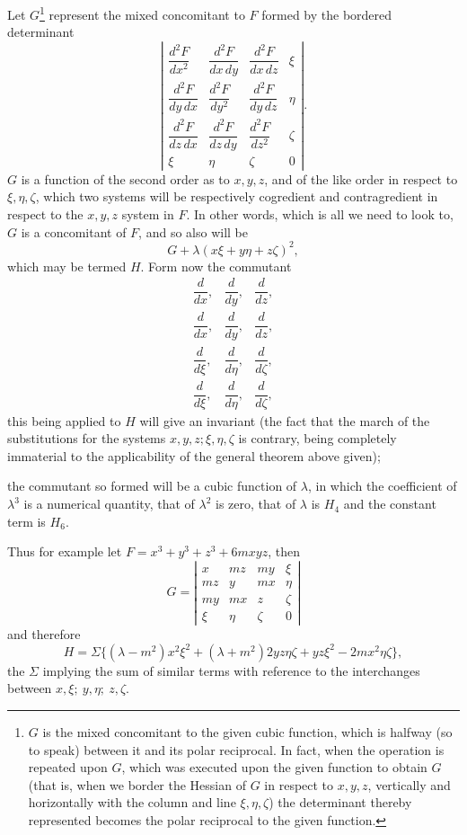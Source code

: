 \documentclass[11pt]{article}
\newcommand{\sourcepage}[1]{\marginpar{\scriptsize p.~#1}}
\begin{document}
Let $G$\footnote{$G$ is the mixed concomitant to the given cubic function, which is halfway (so to speak) between it and its polar reciprocal. In fact, when the operation is repeated upon $G$, which was executed upon the given function to obtain $G$ (that is, when we border the Hessian of $G$ in respect to $x,y,z$, vertically and horizontally with the column and line $\xi,\eta,\zeta$) the determinant thereby represented becomes the polar reciprocal to the given function.} represent the mixed concomitant to $F$ formed by the bordered determinant
\[
\left|\begin{array}{cccc}
\dfrac{d^2F}{dx^2}&\dfrac{d^2F}{dx\,dy}&\dfrac{d^2F}{dx\,dz}&\xi\\[0.6em]
\dfrac{d^2F}{dy\,dx}&\dfrac{d^2F}{dy^2}&\dfrac{d^2F}{dy\,dz}&\eta\\[0.6em]
\dfrac{d^2F}{dz\,dx}&\dfrac{d^2F}{dz\,dy}&\dfrac{d^2F}{dz^2}&\zeta\\[0.6em]
\xi&\eta&\zeta&0
\end{array}\right|.
\]
$G$ is a function of the second order as to $x,y,z$, and of the like order in respect to $\xi,\eta,\zeta$, which two systems will be respectively cogredient and contragredient in respect to the $x,y,z$ system in $F$. In other words, which is all we need to look to, $G$ is a concomitant of $F$, and so also will be
\[
G+\lambda(x\xi+y\eta+z\zeta)^2,
\]
which may be termed $H$. Form now the commutant
\[
\begin{array}{ccc}
\dfrac{d}{dx},&\dfrac{d}{dy},&\dfrac{d}{dz},\\[0.6em]
\dfrac{d}{dx},&\dfrac{d}{dy},&\dfrac{d}{dz},\\[0.6em]
\dfrac{d}{d\xi},&\dfrac{d}{d\eta},&\dfrac{d}{d\zeta},\\[0.6em]
\dfrac{d}{d\xi},&\dfrac{d}{d\eta},&\dfrac{d}{d\zeta},
\end{array}
\]
this being applied to $H$ will give an invariant (the fact that the march of the substitutions for the systems $x,y,z;\xi,\eta,\zeta$ is contrary, being completely immaterial to the applicability of the general theorem above given);

\sourcepage{310}
the commutant so formed will be a cubic function of $\lambda$, in which the coefficient of $\lambda^3$ is a numerical quantity, that of $\lambda^2$ is zero, that of $\lambda$ is $H_4$ and the constant term is $H_6$.

Thus for example let $F=x^3+y^3+z^3+6mxyz$, then
\[
G=\left|\begin{array}{cccc}
x&mz&my&\xi\\
mz&y&mx&\eta\\
my&mx&z&\zeta\\
\xi&\eta&\zeta&0
\end{array}\right|
\]
and therefore
\[
H=\Sigma\{(\lambda-m^2)x^2\xi^2+(\lambda+m^2)2yz\eta\zeta
+yz\xi^2-2mx^2\eta\zeta\},
\]
the $\Sigma$ implying the sum of similar terms with reference to the interchanges between $x,\xi;\ y,\eta;\ z,\zeta$.
\end{document}
